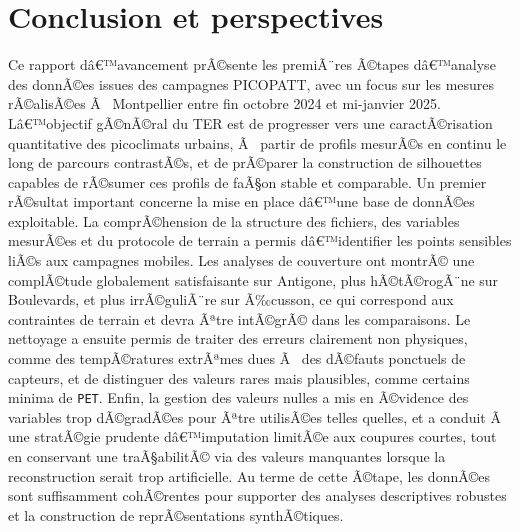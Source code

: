 \documentclass{article}
\begin{document}
\newpage
\section{Conclusion et perspectives}
\label{sec:conclusion}

Ce rapport dâ€™avancement prÃ©sente les premiÃ¨res Ã©tapes dâ€™analyse des donnÃ©es issues des campagnes PICOPATT, avec un focus sur les mesures rÃ©alisÃ©es Ã  Montpellier entre fin octobre 2024 et mi-janvier 2025. Lâ€™objectif gÃ©nÃ©ral du TER est de progresser vers une caractÃ©risation quantitative des picoclimats urbains, Ã  partir de profils mesurÃ©s en continu le long de parcours contrastÃ©s, et de prÃ©parer la construction de silhouettes capables de rÃ©sumer ces profils de faÃ§on stable et comparable.
Un premier rÃ©sultat important concerne la mise en place dâ€™une base de donnÃ©es exploitable. La comprÃ©hension de la structure des fichiers, des variables mesurÃ©es et du protocole de terrain a permis dâ€™identifier les points sensibles liÃ©s aux campagnes mobiles. Les analyses de couverture ont montrÃ© une complÃ©tude globalement satisfaisante sur Antigone, plus hÃ©tÃ©rogÃ¨ne sur Boulevards, et plus irrÃ©guliÃ¨re sur Ã‰cusson, ce qui correspond aux contraintes de terrain et devra Ãªtre intÃ©grÃ© dans les comparaisons. Le nettoyage a ensuite permis de traiter des erreurs clairement non physiques, comme des tempÃ©ratures extrÃªmes dues Ã  des dÃ©fauts ponctuels de capteurs, et de distinguer des valeurs rares mais plausibles, comme certains minima de \texttt{PET}. Enfin, la gestion des valeurs nulles a mis en Ã©vidence des variables trop dÃ©gradÃ©es pour Ãªtre utilisÃ©es telles quelles, et a conduit Ã  une stratÃ©gie prudente dâ€™imputation limitÃ©e aux coupures courtes, tout en conservant une traÃ§abilitÃ© via des valeurs manquantes lorsque la reconstruction serait trop artificielle. Au terme de cette Ã©tape, les donnÃ©es sont suffisamment cohÃ©rentes pour supporter des analyses descriptives robustes et la construction de reprÃ©sentations synthÃ©tiques.

\medskip
\end{document}
